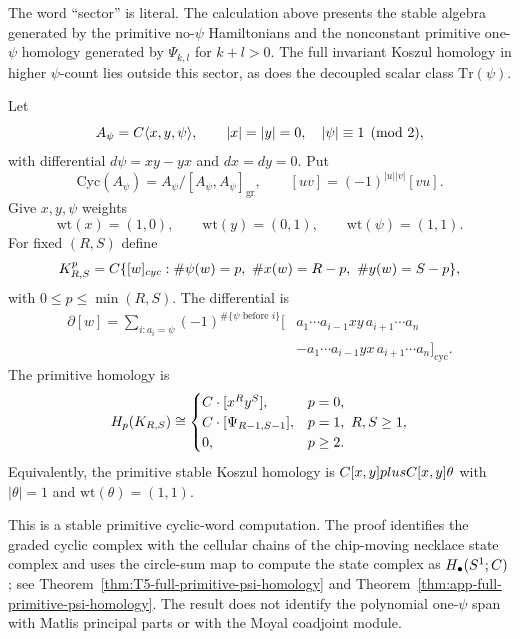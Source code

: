 \documentclass[11pt]{memoir}
\begin{document}
\begin{rmk}
  The word ``sector'' is literal. The calculation above presents the stable
  algebra generated by the primitive no-$\psi$ Hamiltonians and the nonconstant
  primitive one-$\psi$ homology generated by $\Psi_{k,l}$ for $k+l>0$. The full
  invariant Koszul homology in higher $\psi$-count lies outside this sector, as
  does the decoupled scalar class $\mathrm{Tr}(\psi)$.
\end{rmk}

\begin{cor}\label{cor:full-primitive-koszul-homology}
  Let
	  $$A_{\psi}=C\langle x,y,\psi\rangle,\qquad
	    |x|=|y|=0,\quad |\psi|\equiv1\pmod 2,$$
  with differential $d\psi=xy-yx$ and $dx=dy=0$. Put
  $$\mathrm{Cyc}(A_{\psi})=A_{\psi}/[A_{\psi},A_{\psi}]_{\mathrm{gr}},\qquad
    [uv]=(-1)^{|u||v|}[vu].$$
  Give $x,y,\psi$ weights
  $$\mathrm{wt}(x)=(1,0),\qquad \mathrm{wt}(y)=(0,1),\qquad
    \mathrm{wt}(\psi)=(1,1).$$
  For fixed $(R,S)$ define
  $$K^p_{R,S}=C\{[w]_{cyc}:
    \#\psi(w)=p,\ \#x(w)=R-p,\ \#y(w)=S-p\},$$
  with $0\leq p\leq\min(R,S)$. The differential is
  \begin{align*}
  \partial[w]
    =\sum_{i:a_i=\psi}(-1)^{\#\{\psi\text{ before }i\}}
    [&a_1\cdots a_{i-1}xy\,a_{i+1}\cdots a_n\\
     &-a_1\cdots a_{i-1}yx\,a_{i+1}\cdots a_n]_{\mathrm{cyc}}.
  \end{align*}
  The primitive homology is
  $$H_p(K_{R,S})\cong
    \begin{cases}
      C\cdot[x^Ry^S],&p=0,\\
      C\cdot[\Psi_{R-1,S-1}],&p=1,\ R,S\geq1,\\
      0,&p\geq2.
    \end{cases}$$
  Equivalently, the primitive stable Koszul homology is
  $C[x,y]plusC[x,y]\theta$ with $|\theta|=1$ and
  $\mathrm{wt}(\theta)=(1,1)$.

  This is a stable primitive cyclic-word computation.  The
  proof identifies the graded cyclic complex with the cellular chains of
  the chip-moving necklace state complex and uses the circle-sum map to compute
  the state complex as \(H_\bullet(S^1;C)\); see
  Theorem~\ref{thm:T5-full-primitive-psi-homology} and
  Theorem~\ref{thm:app-full-primitive-psi-homology}.  The result does
  not identify the polynomial one-\(\psi\) span with Matlis principal
  parts or with the Moyal coadjoint module.
\end{cor}
\end{document}
